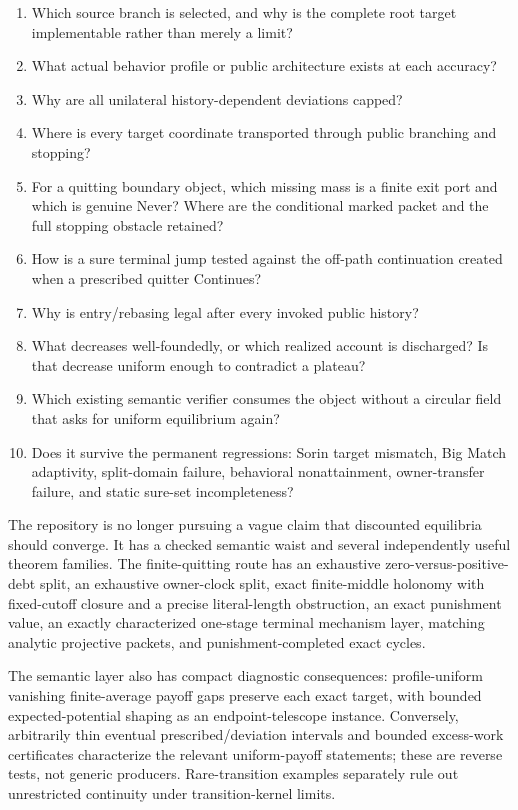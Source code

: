 \documentclass[11pt]{article}
\begin{document}
\begin{enumerate}
\item Which source branch is selected, and why is the complete root target
implementable rather than merely a limit?
\item What actual behavior profile or public architecture exists at each
accuracy?
\item Why are all unilateral history-dependent deviations capped?
\item Where is every target coordinate transported through public branching
and stopping?
\item For a quitting boundary object, which missing mass is a finite exit port
and which is genuine Never?  Where are the conditional marked packet and the
full stopping obstacle retained?
\item How is a sure terminal jump tested against the off-path continuation
created when a prescribed quitter Continues?
\item Why is entry/rebasing legal after every invoked public history?
\item What decreases well-foundedly, or which realized account is discharged?
Is that decrease uniform enough to contradict a plateau?
\item Which existing semantic verifier consumes the object without a circular
field that asks for uniform equilibrium again?
\item Does it survive the permanent regressions: Sorin target mismatch, Big
Match adaptivity, split-domain failure, behavioral nonattainment,
owner-transfer failure, and static sure-set incompleteness?
\end{enumerate}

The repository is no longer pursuing a vague claim that discounted equilibria
should converge.  It has a checked semantic waist and several independently
useful theorem families.  The finite-quitting route has an exhaustive
zero-versus-positive-debt split, an exhaustive owner-clock split, exact
finite-middle holonomy with fixed-cutoff closure and a precise literal-length
obstruction, an exact punishment value, an exactly characterized one-stage
terminal mechanism layer, matching analytic projective packets, and
punishment-completed exact cycles.

The semantic layer also has compact diagnostic consequences: profile-uniform
vanishing finite-average payoff gaps preserve each exact target, with bounded
expected-potential shaping as an endpoint-telescope instance.  Conversely,
arbitrarily thin eventual prescribed/deviation intervals and bounded
excess-work certificates characterize the relevant uniform-payoff statements;
these are reverse tests, not generic producers.  Rare-transition examples
separately rule out unrestricted continuity under transition-kernel limits.
\end{document}
